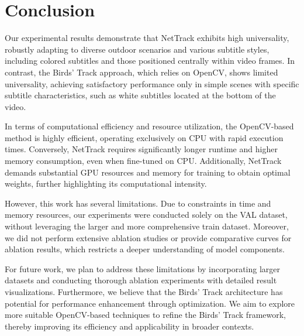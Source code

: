 \section{Conclusion}
Our experimental results demonstrate that NetTrack exhibits high universality, robustly adapting to diverse outdoor scenarios and various subtitle styles, including colored subtitles and those positioned centrally within video frames. In contrast, the Birds' Track approach, which relies on OpenCV, shows limited universality, achieving satisfactory performance only in simple scenes with specific subtitle characteristics, such as white subtitles located at the bottom of the video.

In terms of computational efficiency and resource utilization, the OpenCV-based method is highly efficient, operating exclusively on CPU with rapid execution times. Conversely, NetTrack requires significantly longer runtime and higher memory consumption, even when fine-tuned on CPU. Additionally, NetTrack demands substantial GPU resources and memory for training to obtain optimal weights, further highlighting its computational intensity.

However, this work has several limitations. Due to constraints in time and memory resources, our experiments were conducted solely on the VAL dataset, without leveraging the larger and more comprehensive train dataset. Moreover, we did not perform extensive ablation studies or provide comparative curves for ablation results, which restricts a deeper understanding of model components.

For future work, we plan to address these limitations by incorporating larger datasets and conducting thorough ablation experiments with detailed result visualizations. Furthermore, we believe that the Birds' Track architecture has potential for performance enhancement through optimization. We aim to explore more suitable OpenCV-based techniques to refine the Birds' Track framework, thereby improving its efficiency and applicability in broader contexts.